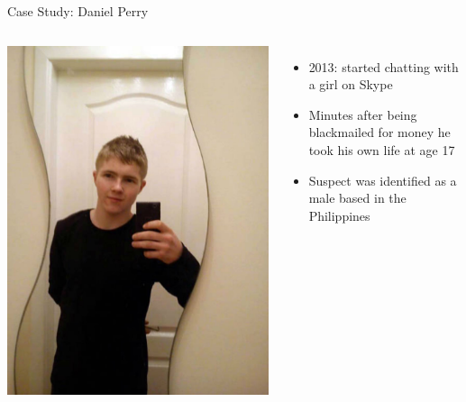 \documentclass[nobackground,dvipsnames,table,aspectratio=169]{beamer}
\begin{document}
\begin{frame}{Case Study: Daniel Perry}
    \begin{columns}
            \includegraphics[width=\textwidth]{daniel-perry}
            \begin{itemize}
                \item 2013: started chatting with a girl on Skype
                \item Minutes after being blackmailed for money he took his own life at age 17
                \item Suspect was identified as a male based in the Philippines
            \end{itemize}
    \end{columns}
\end{frame}
\end{document}
